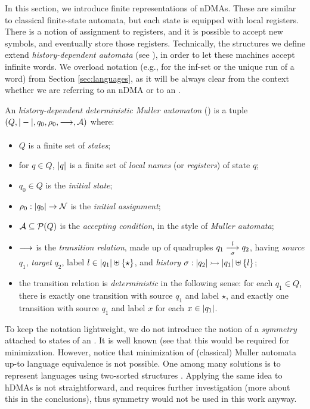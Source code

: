 
In this section, we introduce finite representations of nDMAs. These are similar to classical finite-state automata, but each state is equipped with local registers. There is a notion of assignment to registers, and it is possible to accept new symbols, and eventually store those registers. Technically, the structures we define extend \emph{history-dependent automata} (see \cite{TODO}), in order to let these machines accept infinite words. We overload notation (e.g., for the inf-set or the unique run of a word) from Section \ref{sec:languages}, as it will be always clear from the context whether we are referring to an nDMA or to an \hdma.

\begin{definition}\label{def:hdma}
 An \emph{history-dependent deterministic Muller automaton} (\hdma) is a tuple $(Q,|-|,q_0,\rho_0,\overset{}{\underset{}{\longrightarrow}},\mathcal{A})$
 where:
 \begin{itemize}
  \item $Q$ is a finite set of \emph{states};
  \item for $q \in Q$, $|q|$ is a finite set of \emph{local names} (or \emph{registers}) of state $q$;
  \item $q_0 \in Q$ is the \emph{initial state};
  \item $\rho_0 : |q_0| \to \mathcal{N}$ is the \emph{initial assignment};
  \item $\mathcal{A} \subseteq \mathcal{P}(Q)$ is the \emph{accepting condition}, in the style of \emph{Muller automata};
  \item $\overset{}{\underset{}{\longrightarrow}}$ is the \emph{transition relation}, made up of quadruples $q_1 \overset{l}{\underset{\sigma}{\longrightarrow}} q_2$, having \emph{source} $q_1$, \emph{target} $q_2$, label $l \in |q_1| \uplus \{\star\}$, and \emph{history} $\sigma : |q_2| \rightarrowtail |q_1| \uplus \{l\}$;
  \item the transition relation is \emph{deterministic} in the following sense: for each $q_1 \in Q$,   there is exactly one transition with source $q_1$ and label $\star$, and exactly one transition with source $q_1$ and label $x$ for each $x \in |q_1|$.
 \end{itemize}
\end{definition}
%

\begin{remark}
To keep the notation lightweight, we do not introduce the notion of a \emph{symmetry} attached to states of an \hdma. It is well known (see \cite{PistoreThesis?} that this would be required for minimization. However, notice that minimization of (classical) Muller automata up-to language equivalence is not possible. One among many solutions is to represent languages using two-sorted structures \cite{CV12}. Applying the same idea to hDMAs is not straightforward, and requires further investigation (more about this in the conclusions), thus symmetry would not be used in this work anyway. 
\end{remark}

